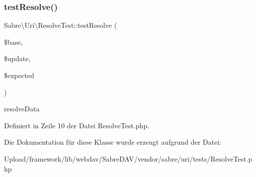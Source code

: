\subsubsection{\texorpdfstring{test\+Resolve()}{testResolve()}}
{\footnotesize\ttfamily Sabre\textbackslash{}\+Uri\textbackslash{}\+Resolve\+Test\+::test\+Resolve (\begin{DoxyParamCaption}\item[{}]{\$base,  }\item[{}]{\$update,  }\item[{}]{\$expected }\end{DoxyParamCaption})}

resolve\+Data 

Definiert in Zeile 10 der Datei Resolve\+Test.\+php.



Die Dokumentation für diese Klasse wurde erzeugt aufgrund der Datei\+:\begin{DoxyCompactItemize}
\item 
Upload/framework/lib/webdav/\+Sabre\+D\+A\+V/vendor/sabre/uri/tests/Resolve\+Test.\+php\end{DoxyCompactItemize}
